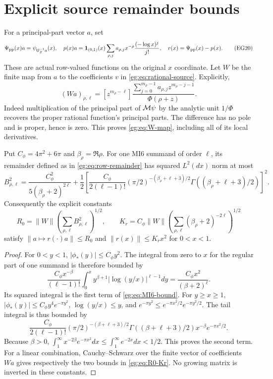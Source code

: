 \section{Explicit source remainder bounds}\label{eg:sec:remainder}
For a principal-part vector $a$, set
\[
 \Psi_{\rm pp}(x)a=\psi_{\mathsf U_Z^{-1}a}(x),\quad
 p(x)a=\mathbf1_{(0,1)}(x)\sum_{\rho,j}a_{\rho,j}
                   x^{-\rho}\frac{(-\log x)^j}{j!},\quad
 r(x)=\Psi_{\rm pp}(x)-p(x).
 \tag{EG20}\label{eg:eq:row-remainder}
\]
These are actual row-valued functions on the original $x$ coordinate.
Let $W$ be the finite map from $a$ to the coefficients $v$ in
\eqref{eg:eq:rational-source}. Explicitly,
\[
 (Wa)_{\rho,\ell}=[z^{m_\rho-\ell}]
 \frac{\sum_{j=0}^{m_\rho-1}a_{\rho,j}z^{m_\rho-j-1}}
                  {\Phi(\rho+z)}.
 \tag{EG21}\label{eg:eq:W-map}
\]
Indeed multiplication of the principal part of $\mathcal M\psi$ by the
analytic unit $1/\Phi$ recovers the proper rational function's
principal parts. The difference has no pole and is proper, hence is
zero. This proves \eqref{eg:eq:W-map}, including all of its local derivatives.

\begin{eglemma}\label{eg:lem:R0}
Put $C_\phi=4\pi^2+6\pi$ and $\beta_\rho=\Re\rho$. For one MI6
summand of order $\ell$, its remainder defined as in
\eqref{eg:eq:row-remainder} has squared $L^2(dx)$ norm at most
\[
 B_{\rho,\ell}^2=
 \frac{C_\phi^2}{5(\beta_\rho+2)^{2\ell}}
 +\frac12\left[
 \frac{C_\phi}{2(\ell-1)!}
 (\pi/2)^{-(\beta_\rho+\ell+3)/2}
 \Gamma((\beta_\rho+\ell+3)/2)\right]^2.
 \tag{EG22}\label{eg:eq:MI6-bound}
\]
Consequently the explicit constants
\[
 R_0=\|W\|\left(\sum_{\rho,\ell}B_{\rho,\ell}^2\right)^{1/2},\qquad
 K_r=C_\phi\|W\|\left(\sum_{\rho,\ell}
                         (\beta_\rho+2)^{-2\ell}\right)^{1/2}
 \tag{EG23}\label{eg:eq:R0-Kr}
\]
satisfy $\|a\mapsto r(\cdot)a\|\le R_0$ and
$\|r(x)\|\le K_rx^2$ for $0<x<1$.
\end{eglemma}
\begin{proof}
For $0<y<1$, $|\phi_*(y)|\le C_\phi y^2$. The integral from zero
to $x$ for the regular part of one summand is therefore bounded by
\[
 \frac{C_\phi x^{-\beta}}{(\ell-1)!}
 \int_0^x y^{\beta+1}|\log(y/x)|^{\ell-1}dy
       =\frac{C_\phi x^2}{(\beta+2)^\ell}.
\]
Its squared integral is the first term of \eqref{eg:eq:MI6-bound}.
For $y\ge x\ge1$, $|\phi_*(y)|\le C_\phi y^4e^{-\pi y^2}$,
$\log(y/x)\le y$, and
$e^{-\pi y^2}\le e^{-\pi x^2/2}e^{-\pi y^2/2}$. The tail integral
is thus bounded by
\[
 \frac{C_\phi}{2(\ell-1)!}
 (\pi/2)^{-(\beta+\ell+3)/2}\Gamma((\beta+\ell+3)/2)
                    x^{-\beta}e^{-\pi x^2/2}.
\]
Because $\beta>0$, $\int_1^\infty x^{-2\beta}e^{-\pi x^2}dx
\le\int_1^\infty e^{-2x}dx<1/2$. This proves the second term.
For a linear combination, Cauchy--Schwarz over the finite vector
of coefficients $Wa$ gives respectively the two bounds in
\eqref{eg:eq:R0-Kr}. No growing matrix is inverted in these constants.
\end{proof}


